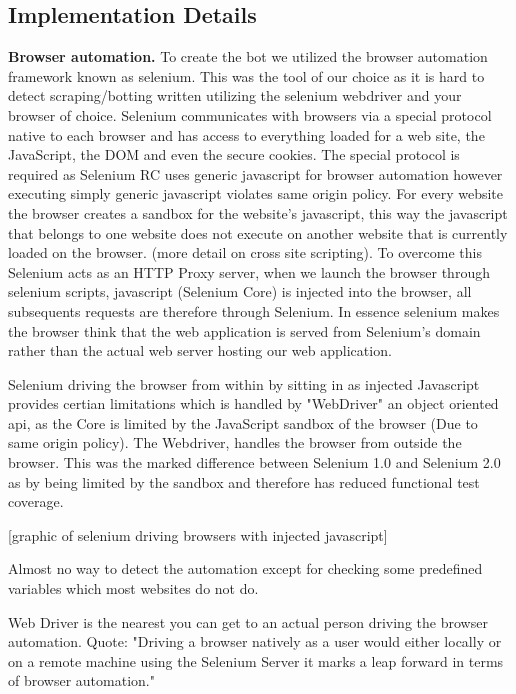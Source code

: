 \subsection{Implementation Details}

\textbf{Browser automation.}
To create the bot we utilized the browser automation framework known as selenium. This was 
the tool of our choice as it is hard to detect scraping/botting written utilizing the selenium 
webdriver and your browser of choice. Selenium communicates with browsers via a special protocol 
native to each browser and has access to everything loaded for a web site, the JavaScript, the DOM 
and even the secure cookies. The special protocol is required as  Selenium RC uses generic javascript 
for browser automation however executing simply generic javascript violates same origin policy. For 
every website the browser creates a sandbox for the website's javascript, this way the javascript that 
belongs to one website does not execute on another website that is currently loaded on the browser. 
(more detail on cross site scripting). To overcome this Selenium acts as an HTTP Proxy server, when 
we launch the browser through selenium scripts, javascript (Selenium Core) is injected into the browser, 
all subsequents requests are therefore through Selenium. In essence selenium makes the browser think that 
the web application is served from Selenium's domain rather than the actual web server hosting our web 
application.

Selenium driving the browser from within by sitting in as injected Javascript provides certian limitations 
which is handled by "WebDriver" an object oriented api, as the Core is limited by the JavaScript sandbox of 
the browser (Due to same origin policy). The Webdriver, handles the browser from outside the browser. This was 
the marked difference between Selenium 1.0 and Selenium 2.0 as by being limited by the sandbox and therefore 
has reduced functional test coverage. 

[graphic of selenium driving browsers with injected javascript]


Almost no way to detect the automation except for checking some predefined variables which most websites do not do.


Web Driver is the nearest you can get to an actual person driving the browser automation. Quote:  "Driving a browser natively as a user would either locally or on a remote machine using the Selenium Server it marks a leap forward in terms of browser automation."

